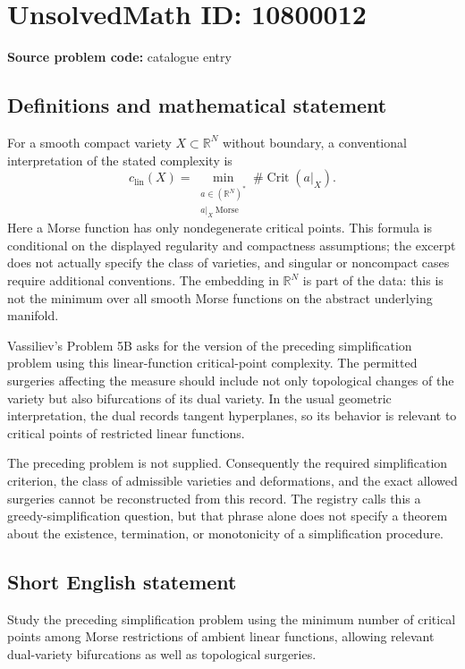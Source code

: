 \documentclass[11pt]{article}
\newcommand{\R}{\mathbb{R}}
\begin{document}
\section*{UnsolvedMath ID: 10800012}
\textbf{Source problem code:} catalogue entry
\subsection{Definitions and mathematical statement}
For a smooth compact variety $X\subset\R^N$ without boundary, a conventional interpretation of the stated complexity is
\[
 c_{\mathrm{lin}}(X)=
 \min_{\substack{a\in(\R^N)^*\\ a|_X\ \mathrm{Morse}}}
 \#\operatorname{Crit}(a|_X).
\]
Here a Morse function has only nondegenerate critical points. This formula is conditional on the displayed regularity and compactness assumptions; the excerpt does not actually specify the class of varieties, and singular or noncompact cases require additional conventions. The embedding in $\R^N$ is part of the data: this is not the minimum over all smooth Morse functions on the abstract underlying manifold.

Vassiliev's Problem 5B asks for the version of the preceding simplification problem using this linear-function critical-point complexity. The permitted surgeries affecting the measure should include not only topological changes of the variety but also bifurcations of its dual variety. In the usual geometric interpretation, the dual records tangent hyperplanes, so its behavior is relevant to critical points of restricted linear functions.

The preceding problem is not supplied. Consequently the required simplification criterion, the class of admissible varieties and deformations, and the exact allowed surgeries cannot be reconstructed from this record. The registry calls this a greedy-simplification question, but that phrase alone does not specify a theorem about the existence, termination, or monotonicity of a simplification procedure.
\subsection{Short English statement}
Study the preceding simplification problem using the minimum number of critical points among Morse restrictions of ambient linear functions, allowing relevant dual-variety bifurcations as well as topological surgeries.
\end{document}
